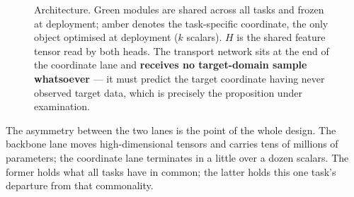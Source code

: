 \documentclass[11pt]{article}
\begin{document}
\begin{figure}[htbp]

\caption{Architecture. Green modules are shared across all tasks and frozen at deployment; amber
denotes the task-specific coordinate, the only object optimised at deployment ($k$ scalars). $H$ is
the shared feature tensor read by both heads. The
transport network sits at the end of the coordinate lane and \textbf{receives no target-domain
sample whatsoever} --- it must predict the target coordinate having never observed target data,
which is precisely the proposition under examination.}
\label{fig:arch}
\end{figure}

The asymmetry between the two lanes is the point of the whole design. The backbone lane moves
high-dimensional tensors and carries tens of millions of parameters; the coordinate lane terminates
in a little over a dozen scalars. The former holds what all tasks have in common; the latter holds
this one task's departure from that commonality.
\end{document}
